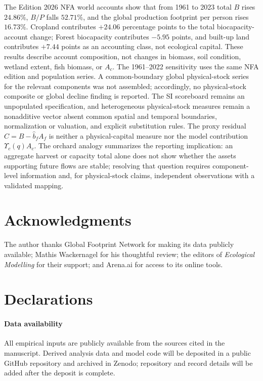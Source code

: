 \documentclass[preprint,12pt,authoryear]{elsarticle}
\newcommand{\Ups}{\Upsilon_c}
\begin{document}
The Edition 2026 NFA world accounts show that from 1961 to 2023 total $B$ rises $24.86\%$, $B/P$ falls $52.71\%$, and the global production footprint per person rises $16.73\%$. Cropland contributes $+24.06$ percentage points to the total biocapacity-account change; Forest biocapacity contributes $-5.95$ points, and built-up land contributes $+7.44$ points as an accounting class, not ecological capital. These results describe account composition, not changes in biomass, soil condition, wetland extent, fish biomass, or $A_c$. The 1961--2022 sensitivity uses the same NFA edition and population series. A common-boundary global physical-stock series for the relevant components was not assembled; accordingly, no physical-stock composite or global decline finding is reported. The SI scoreboard remains an unpopulated specification, and heterogeneous physical-stock measures remain a nonadditive vector absent common spatial and temporal boundaries, normalization or valuation, and explicit substitution rules. The proxy residual $C=B-\hat b_fA_f$ is neither a physical-capital measure nor the model contribution $\Ups(q)A_c$. The orchard analogy summarizes the reporting implication: an aggregate harvest or capacity total alone does not show whether the assets supporting future flows are stable; resolving that question requires component-level information and, for physical-stock claims, independent observations with a validated mapping.

\section*{Acknowledgments}

The author thanks Global Footprint Network for making its data publicly available; Mathis Wackernagel for his thoughtful review; the editors of \emph{Ecological Modelling} for their support; and Arena.ai for access to its online tools.

\section*{Declarations}

\paragraph{Data availability} All empirical inputs are publicly available from the sources cited in the manuscript. Derived analysis data and model code will be deposited in a public GitHub repository and archived in Zenodo; repository and record details will be added after the deposit is complete.
\end{document}
